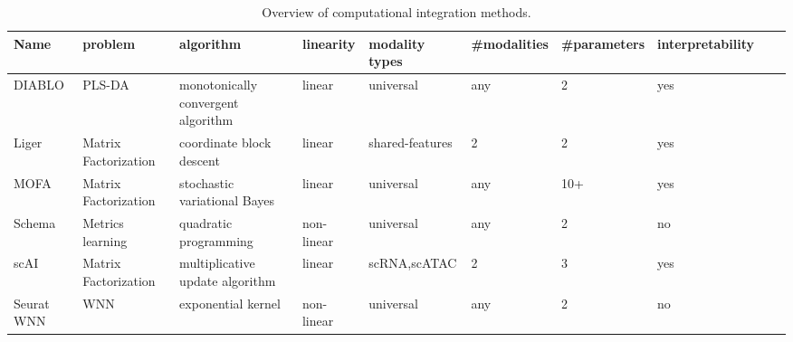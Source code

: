 \begin{table}[!ht]
    \tiny
	\centering
	\begin{tabular}{llllllllll}
		\toprule
	   Name & problem &algorithm & linearity & modality types & \#modalities & \#parameters & interpretability \\
		\midrule
        DIABLO &PLS-DA& monotonically convergent algorithm & linear& universal & any & 2 & yes \\
        Liger &Matrix Factorization& coordinate block descent &linear& shared-features& 2 & 2 & yes \\
        MOFA   &Matrix Factorization& stochastic variational Bayes &linear& universal & any & 10+ & yes \\
        Schema &Metrics learning& quadratic programming  &  non-linear & universal& any & 2 & no\\
        scAI &Matrix Factorization& multiplicative update algorithm &linear& scRNA,scATAC & 2 & 3 & yes &\\
        Seurat WNN  & WNN & exponential kernel &non-linear&universal & any & 2 & no &\\
		\bottomrule
	\end{tabular}
	\vspace{0.1cm}
	\caption[Overview of computational integration methods]{Overview of computational integration methods.}
	\label{tab:methods_integration_overview}
\end{table}
%


